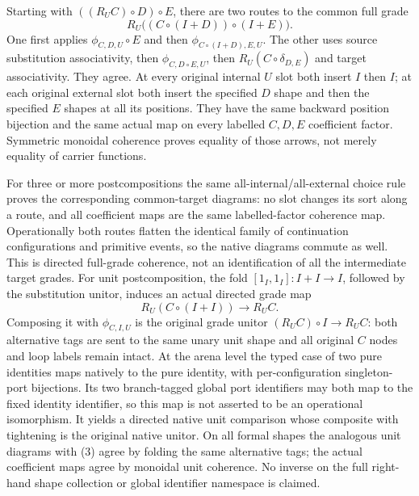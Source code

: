 \documentclass{article}
\begin{document}
Starting with $((R_UC)\circ D)\circ E$, there are two routes to the common
full grade
\[
 R_U\bigl((C\circ(I+D))\circ(I+E)\bigr).
\]
One first applies $\phi_{C,D,U}\circ E$ and then
$\phi_{C\circ(I+D),E,U}$. The other uses source substitution associativity,
then $\phi_{C,D\circ E,U}$, then $R_U(C\circ\delta_{D,E})$ and target
associativity. They agree. At every original internal $U$ slot both insert
$I$ then $I$; at each original external slot both insert the specified $D$
shape and then the specified $E$ shapes at all its positions. They have the
same backward position bijection and the same actual map on every labelled
$C,D,E$ coefficient factor. Symmetric monoidal coherence proves equality
of those arrows, not merely equality of carrier functions.

For three or more postcompositions the same all-internal/all-external choice
rule proves the corresponding common-target diagrams: no slot changes its
sort along a route, and all coefficient maps are the same labelled-factor
coherence map. Operationally both routes flatten the identical family of
continuation configurations and primitive events, so the native diagrams
commute as well. This is directed full-grade coherence, not an identification
of all the intermediate target grades. For unit postcomposition, the fold $[1_I,1_I]:I+I\to I$,
followed by the substitution unitor, induces an actual directed grade map
\[
 R_U(C\circ(I+I))\longrightarrow R_UC.
\]
Composing it with $\phi_{C,I,U}$ is the original grade unitor
$(R_UC)\circ I\to R_UC$: both alternative tags are sent to the same
unary unit shape and all original $C$ nodes and loop labels remain intact.
At the arena level the typed case of two pure identities maps natively to
the pure identity, with per-configuration singleton-port bijections. Its two
branch-tagged global port identifiers may both map to the fixed identity
identifier, so this map is not asserted to be an operational isomorphism.
It yields a directed native unit comparison whose composite with tightening
is the original native unitor. On all formal shapes the analogous unit
diagrams with (3) agree by folding the same alternative tags; the actual
coefficient maps agree by monoidal unit coherence. No inverse on the full
right-hand shape collection or global identifier namespace is claimed.
\end{document}
